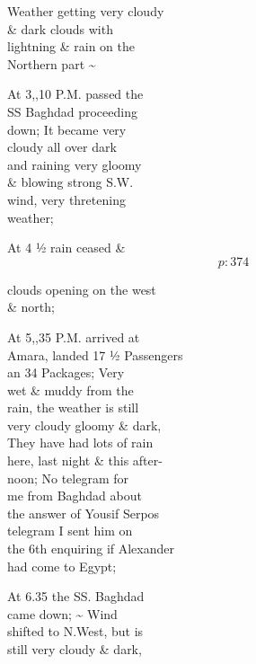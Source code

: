 \documentclass{report}
\begin{document}
	\par{
 	Weather getting very cloudy\ \\\& dark clouds with\ \\lightning \& rain on the\ \\Northern part \~{}\ \\
	}

	\par{
 	At 3,,10 P.M. passed the\ \\SS Baghdad proceeding\ \\down; It became very\ \\cloudy all over dark\ \\and raining very gloomy\ \\\& blowing strong S.W.\ \\wind, very thretening\ \\weather;\ \\
	}

	\par{
 	At 4 ½ rain ceased \&\ \\
  \[p: 374 \]

	}

	\par{
 	clouds opening on the west\ \\\& north;\ \\
	}

	\par{
 	At 5,,35 P.M. arrived at\ \\Amara, landed 17 ½ Passengers\ \\an 34 Packages; Very\ \\wet \& muddy from the\ \\rain, the weather is still\ \\very cloudy gloomy \& dark,\ \\They have had lots of rain\ \\here, last night \& this after-\ \\noon; No telegram for\ \\me from Baghdad about\ \\the answer of Yousif Serpos\ \\telegram I sent him on\ \\the 6th enquiring if Alexander\ \\had come to Egypt;\ \\
	}

	\par{
 	At 6.35 the SS. Baghdad\ \\came down; \~{} Wind\ \\shifted to N.West, but is\ \\still very cloudy \& dark,\ \\
	}
\end{document}
